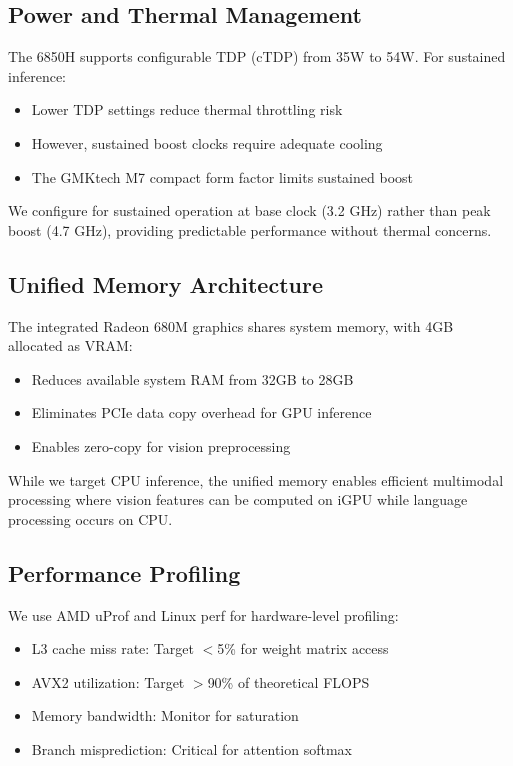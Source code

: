 \subsection{Power and Thermal Management}

The 6850H supports configurable TDP (cTDP) from 35W to 54W. For sustained inference:

\begin{itemize}
    \item Lower TDP settings reduce thermal throttling risk
    \item However, sustained boost clocks require adequate cooling
    \item The GMKtech M7 compact form factor limits sustained boost
\end{itemize}

We configure for sustained operation at base clock (3.2 GHz) rather than peak boost (4.7 GHz), providing predictable performance without thermal concerns.

\subsection{Unified Memory Architecture}

The integrated Radeon 680M graphics shares system memory, with 4GB allocated as VRAM:

\begin{itemize}
    \item Reduces available system RAM from 32GB to 28GB
    \item Eliminates PCIe data copy overhead for GPU inference
    \item Enables zero-copy for vision preprocessing
\end{itemize}

While we target CPU inference, the unified memory enables efficient multimodal processing where vision features can be computed on iGPU while language processing occurs on CPU.

\subsection{Performance Profiling}

We use AMD uProf and Linux perf for hardware-level profiling:

\begin{itemize}
    \item L3 cache miss rate: Target $<$5\% for weight matrix access
    \item AVX2 utilization: Target $>$90\% of theoretical FLOPS
    \item Memory bandwidth: Monitor for saturation
    \item Branch misprediction: Critical for attention softmax
\end{itemize}

